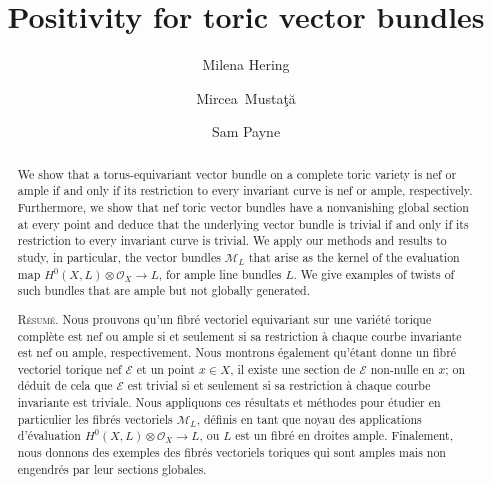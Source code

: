 \documentclass[12pt]{amsart}
\theoremstyle{definition}
\theoremstyle{remark}
\begin{document}
\title{Positivity for toric vector bundles}

\author[M.~Hering]{Milena Hering}
\address{Institute of Mathematics and its Applications,
University of Minnesota, 400 Lind Hall, Minneapolis, MN 55455 USA \ \ \tt hering@ima.umn.edu}

\author[M. Musta\c{t}\u{a}]{Mircea~Musta\c{t}\u{a}}
\address{Department of Mathematics, University of Michigan,
East Hall, Ann Arbor, MI 48109, USA \ \ \tt mmustata@umich.edu}

\author[S.~Payne]{Sam Payne}
\address{Department of Mathematics, Stanford University, Bldg 380, Stanford, CA 94305, USA  \ \ \tt spayne@stanford.edu}


\begin{abstract}
We show that a torus-equivariant vector bundle on a complete toric variety is nef or ample if and only if its restriction to every invariant curve is nef or ample, respectively.  Furthermore, we show that nef toric vector bundles have a nonvanishing global section at every point and deduce that the underlying vector bundle is trivial if and only if its restriction to every invariant curve is trivial.  We apply our methods and results to study, in particular, the vector bundles ${\mathcal{M}}_L$ that arise as the kernel of the evaluation map $H^0(X,L) \otimes {\mathcal{O}}_X \rightarrow L$, for ample line bundles $L$. We give examples of 
twists of such bundles that are ample but not globally generated.

\bigskip

\noindent \textsc{R\'esum\'e}.  Nous prouvons qu'un fibr\'e vectoriel equivariant sur une vari\'et\'e torique compl\`ete est nef ou ample si et seulement si sa restriction \`a chaque courbe invariante est nef ou ample, respectivement.  Nous montrons \'egalement qu'\'etant donne un fibr\'e vectoriel torique nef ${\mathcal{E}}$ et un point $x\in X$, il existe une section de ${\mathcal{E}}$ non-nulle en $x$; on d\'eduit de cela que ${\mathcal{E}}$ est trivial si et seulement si sa restriction \`a chaque courbe invariante est triviale.  Nous appliquons ces 
r\'esultats et m\'ethodes pour \'etudier en particulier les fibr\'es vectoriels ${\mathcal{M}}_L$, 
 d\'efinis en tant que noyau des applications d'\'evaluation 
 $H^0(X,L) \otimes {\mathcal{O}}_X \rightarrow L$, ou $L$
 est un fibr\'e en droites ample.  Finalement, nous donnons des exemples des fibr\'es vectoriels toriques qui sont amples mais non engendr\'{e}s par leur sections globales.
\end{abstract}
\end{document}
